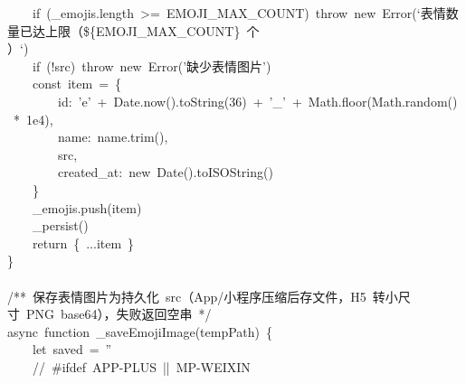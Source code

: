 \documentclass[a4paper,10pt]{article}
\begin{document}
{~~~~if~(\_emojis.length~>=~EMOJI\_MAX\_COUNT)~throw~new~Error(`表情数量已达上限（\$\{EMOJI\_MAX\_COUNT\}~个\\
）`)\\
~~~~if~(!src)~throw~new~Error('缺少表情图片')\\
~~~~const~item~=~\{\\
~~~~~~~~id:~'e'~+~Date.now().toString(36)~+~'\_'~+~Math.floor(Math.random()~*~1e4),\\
~~~~~~~~name:~name.trim(),\\
~~~~~~~~src,\\
~~~~~~~~created\_at:~new~Date().toISOString()\\
~~~~\}\\
~~~~\_emojis.push(item)\\
~~~~\_persist()\\
~~~~return~\{~...item~\}\\
\}\\
\mbox{}\\
/**~保存表情图片为持久化~src（App/小程序压缩后存文件，H5~转小尺寸~PNG~base64），失败返回空串~*/\\
async~function~\_saveEmojiImage(tempPath)~\{\\
~~~~let~saved~=~''\\
~~~~//~\#ifdef~APP-PLUS~||~MP-WEIXIN
}

\newpage
\end{document}
